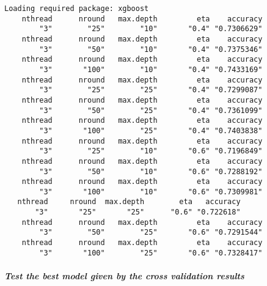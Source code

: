 \documentclass{article}
\begin{document}
    
    \begin{verbatim}
Loading required package: xgboost
    nthread      nround   max.depth         eta    accuracy 
        "3"        "25"        "10"       "0.4" "0.7306629" 
    nthread      nround   max.depth         eta    accuracy 
        "3"        "50"        "10"       "0.4" "0.7375346" 
    nthread      nround   max.depth         eta    accuracy 
        "3"       "100"        "10"       "0.4" "0.7433169" 
    nthread      nround   max.depth         eta    accuracy 
        "3"        "25"        "25"       "0.4" "0.7299087" 
    nthread      nround   max.depth         eta    accuracy 
        "3"        "50"        "25"       "0.4" "0.7361099" 
    nthread      nround   max.depth         eta    accuracy 
        "3"       "100"        "25"       "0.4" "0.7403838" 
    nthread      nround   max.depth         eta    accuracy 
        "3"        "25"        "10"       "0.6" "0.7196849" 
    nthread      nround   max.depth         eta    accuracy 
        "3"        "50"        "10"       "0.6" "0.7288192" 
    nthread      nround   max.depth         eta    accuracy 
        "3"       "100"        "10"       "0.6" "0.7309981" 
   nthread     nround  max.depth        eta   accuracy 
       "3"       "25"       "25"      "0.6" "0.722618" 
    nthread      nround   max.depth         eta    accuracy 
        "3"        "50"        "25"       "0.6" "0.7291544" 
    nthread      nround   max.depth         eta    accuracy 
        "3"       "100"        "25"       "0.6" "0.7328417" 

    \end{verbatim}

    
    \paragraph{\texorpdfstring{\emph{Test the best model given by the cross
validation
results}}{Test the best model given by the cross validation results}}\label{test-the-best-model-given-by-the-cross-validation-results}
\end{document}
